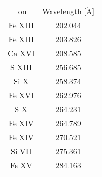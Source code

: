\begin{tabular}{cc}
Ion & Wavelength [$\mathrm{\mathring{A}}$] \\
Fe XIII & 202.044 \\
Fe XIII & 203.826 \\
Ca XVI & 208.585 \\
S XIII & 256.685 \\
Si X & 258.374 \\
Fe XVI & 262.976 \\
S X & 264.231 \\
Fe XIV & 264.789 \\
Fe XIV & 270.521 \\
Si VII & 275.361 \\
Fe XV & 284.163 \\
\end{tabular}
